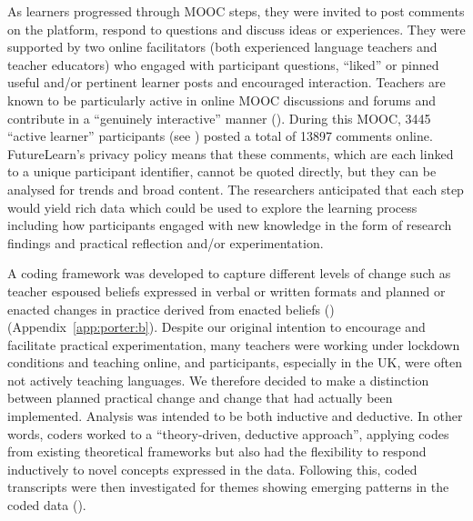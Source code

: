 \documentclass[output=paper]{langscibook}
\begin{document}
As learners progressed through MOOC steps, they were invited to post comments on the platform, respond to questions and discuss ideas or experiences. They were supported by two online facilitators (both experienced language teachers and teacher educators) who engaged with participant questions, ``liked'' or pinned useful and/or pertinent learner posts and encouraged interaction. Teachers are known to be particularly active in online MOOC discussions and forums and contribute in a ``genuinely interactive'' manner (\citealt[6]{Laurillard2014}). During this MOOC, 3445 ``active learner'' participants (see ) posted a total of 13897 comments online. FutureLearn’s privacy policy means that these comments, which are each linked to a unique participant identifier, cannot be quoted directly, but they can be analysed for trends and broad content. The researchers anticipated that each step would yield rich data which could be used to explore the learning process including how participants engaged with new knowledge in the form of research findings and practical reflection and/or experimentation.

A coding framework was developed to capture different levels of change such as teacher espoused beliefs expressed in verbal or written formats and planned or enacted changes in practice derived from enacted beliefs (\citealt{FivesBuehl2012}) (Appendix~\ref{app:porter:b}). Despite our original intention to encourage and facilitate practical experimentation, many teachers were working under lockdown conditions and teaching online, and participants, especially in the UK, were often not actively teaching languages. We therefore decided to make a distinction between planned practical change and change that had actually been implemented. Analysis was intended to be both inductive and deductive. In other words, coders worked to a ``theory-driven, deductive approach'', applying codes from existing theoretical frameworks but also had the flexibility to respond inductively to novel concepts expressed in the data. Following this, coded transcripts were then investigated for themes showing emerging patterns in the coded data (\citealt[2]{XuZammit2020}).
\end{document}
